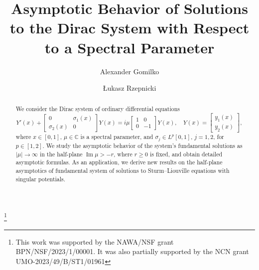 \documentclass[11pt]{amsart}
\theoremstyle{plain}
\theoremstyle{definition}
\theoremstyle{remark}
\numberwithin{equation}{section}
\begin{document}
\title[Asymptotic Behavior of Solutions to the Dirac System]{
Asymptotic Behavior of Solutions \\to the Dirac System
with Respect \\
to a Spectral Parameter
 }

\author{Alexander Gomilko}
\address{Faculty of Mathematics and Computer Science\\
Nicolas Copernicus University\\
Chopin Street 12/18\\
87-100 Toru\'n, Poland}

\author{{\L}ukasz Rzepnicki}
\address{Faculty of Mathematics and Computer Science\\
Nicolas Copernicus University\\
Chopin Street 12/18\\
87-100 Toru\'n, Poland}




\def\today{\number\day \space\ifcase\month\or
 January\or February\or March\or April\or May\or June\or
 July\or August\or September\or October\or November\or December\fi
 \space \number\year}

\thanks{This work was supported by the NAWA/NSF grant BPN/NSF/2023/1/00001. It was also partially supported by the NCN grant UMO-2023/49/B/ST1/01961}




\begin{abstract}
We consider the Dirac system of ordinary differential equations
\[
Y'(x) +
\begin{bmatrix}
0 & \sigma_1(x) \\
\sigma_2(x) & 0
\end{bmatrix}
Y(x) = i\mu
\begin{bmatrix}
1 & 0 \\
0 & -1
\end{bmatrix}
Y(x), \quad
Y(x) =
\begin{bmatrix}
y_1(x) \\
y_2(x)
\end{bmatrix},
\]
where \( x \in [0,1] \), \( \mu \in \mathbb{C} \) is a spectral parameter, and \( \sigma_j \in L^p[0,1] \), \( j = 1,2 \), for \( p \in [1,2] \). We study the asymptotic behavior of the system's fundamental solutions as \( |\mu| \to \infty \) in the half-plane \( \operatorname{Im} \mu > -r \), where \( r \geq 0 \) is fixed, and obtain detailed asymptotic formulas. As an application, we derive new results on the half-plane asymptotics of fundamental system of solutions to Sturm--Liouville equations with singular potentials.
\end{abstract}
\end{document}
